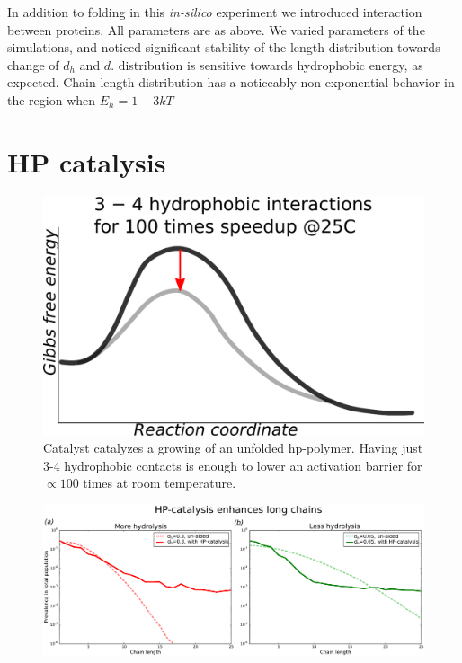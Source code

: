 \documentclass[journal=jacsat,manuscript=article,layout=twocolumn]{achemso}
\begin{document}
In addition to folding in this \textit{in-silico} experiment we introduced interaction between 
proteins. All parameters are as above. We varied parameters of the simulations, and noticed 
significant stability of the length distribution towards change of $d_h$ and $d$. distribution is 
sensitive towards hydrophobic energy, as expected. Chain length distribution has a noticeably 
non-exponential behavior in the region when $E_h= 1-3 kT$



 \newpage
\appendix
\section{HP catalysis}
\begin{figure}[h!]
  \centering
  \includegraphics[width=0.9\columnwidth]{pictures/hp-catalysis-b.pdf} 
  \caption{Catalyst catalyzes a growing of an unfolded hp-polymer. 
           Having just 3-4 hydrophobic contacts is enough to lower an 
           activation barrier for $\propto 100$ times at room 
           temperature.}
  \label{fig:hp-catalysis-b}
\end{figure}


\begin{figure}[h!]
  \centering
  \includegraphics[width=\columnwidth]{pictures/flory-and-hp.pdf} 
  \caption{}
  \label{fig:flory-and-hp}
\end{figure}
\end{document}
